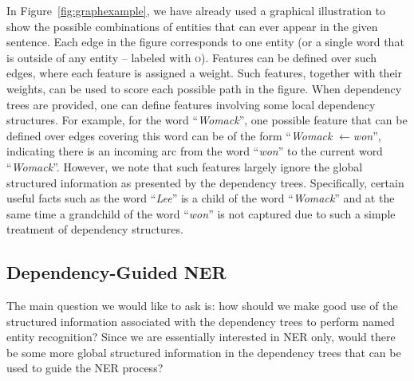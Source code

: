 In Figure~\ref{fig:graphexample}, we have already used a graphical illustration to show the possible combinations of entities that can ever appear in the given sentence.
Each edge in the figure corresponds to one entity (or a single word that is outside of any entity -- labeled with \textsc{o}).
%
%
%
%
Features can be defined over such edges, where each feature is assigned a weight.
Such features, together with their weights, can be used to score each possible path in the figure.
When dependency trees are provided, one can define features involving some local dependency structures.
For example, for the word ``{\em Womack}'', one possible feature that can be defined over edges covering this word can be of the form ``{\em Womack }$\leftarrow${\em won}'', indicating there is an incoming arc from the word ``{\em won}'' to the current word ``{\em Womack}''.
However, we note that such features largely ignore the global structured information as presented by the dependency trees.
Specifically, certain useful facts such as the word ``{\em Lee}'' is a child of the word ``{\em Womack}'' and at the same time a grandchild of the word ``{\em won}'' is not captured due to such a simple treatment of dependency structures.

\subsection{Dependency-Guided NER}


The main question we would like to ask is: how should we make good use of the structured information associated with the dependency trees to perform named entity recognition?
Since we are essentially interested in NER only, would there be some more global structured information in the dependency trees that can be used to guide the NER process?

